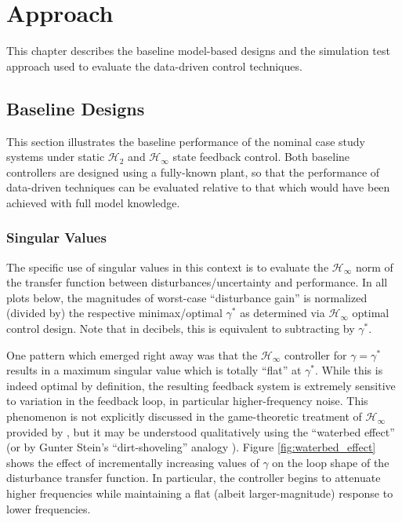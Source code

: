 \chapter{Approach}
\label{chap:approach}
This chapter describes the baseline model-based designs and the simulation test approach used to evaluate the data-driven control techniques.

\section{Baseline Designs}
\label{sect:results:baseline}
This section illustrates the baseline performance of the nominal case study systems under static $\mathcal{H}_{2}$ and $\mathcal{H}_{\infty}$ state feedback control.  Both baseline controllers are designed using a fully-known plant, so that the performance of data-driven techniques can be evaluated relative to that which would have been achieved with full model knowledge.

\subsection{Singular Values}
The specific use of singular values in this context is to evaluate the $\mathcal{H}_{\infty}$ norm of the transfer function between disturbances/uncertainty and performance.  In all plots below, the magnitudes of worst-case ``disturbance gain'' is normalized (divided by) the respective minimax/optimal $\gamma^{*}$ as determined via $\mathcal{H}_{\infty}$ optimal control design.  Note that in decibels, this is equivalent to subtracting by $\gamma^{*}$.

One pattern which emerged right away was that the $\mathcal{H}_{\infty}$ controller for $\gamma = \gamma^{*}$ results in a maximum singular value which is totally ``flat'' at $\gamma^{*}$.  While this is indeed optimal by definition, the resulting feedback system is extremely sensitive to variation in the feedback loop, in particular higher-frequency noise.  This phenomenon is not explicitly discussed in the game-theoretic treatment of $\mathcal{H}_{\infty}$ provided by \cite{bacsar2008h}, but it may be understood qualitatively using the ``waterbed effect'' (or by Gunter Stein's ``dirt-shoveling'' analogy \cite{stein2003respect}).  Figure \ref{fig:waterbed_effect} shows the effect of incrementally increasing values of $\gamma$ on the loop shape of the disturbance transfer function.  In particular, the controller begins to attenuate higher frequencies while maintaining a flat (albeit larger-magnitude) response to lower frequencies.

